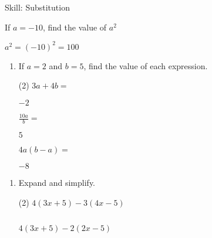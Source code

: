 \clearpage




\clearpage



\begin{bxTip}{Skill: Substitution}


If $a=-10$, find the value of $a^2$


\tcblower

$a^2=(-10)^2=100$ 

\tcblower

\begin{enumerate}[leftmargin=0cm] 

\item If $a=2$ and $b=5$, find the value of each expression.

\begin{tasks}[label=(\alph*), after-item-skip=2pt,after-skip=3pt, label-width=4ex](2)
    \task  $ 3a+4b=$                           \begin{envFillIn}$  -2     $    \end{envFillIn}
    \task  $ \frac{10a}{b}=$                   \begin{envFillIn}$   5     $    \end{envFillIn}
    \task  $ 4a(b-a)=$                         \begin{envFillIn}$  -8     $    \end{envFillIn}
\end{tasks}



\end{enumerate}

\end{bxTip}


\clearpage

\begin{enumerate}[leftmargin=0cm] 

\item Expand and simplify.
    \begin{tasks}[label=(\alph*), after-item-skip=2pt,after-skip=3pt, label-width=4ex](2)
         \task  $ 4(3x+5)-3(4x-5)$       \begin{envAnswer}[blankline=2]    $         $ \end{envAnswer}  
         \task  $ 4(3x+5)-2(2x-5)$       \begin{envAnswer}[blankline=2]    $         $ \end{envAnswer}  
    \end{tasks}





\end{enumerate}



